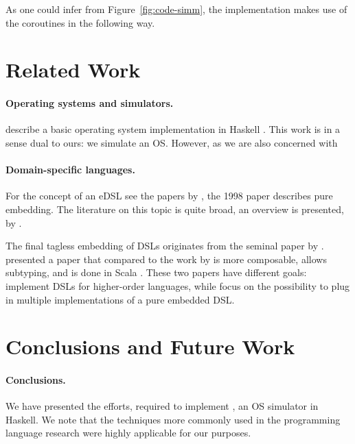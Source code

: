 As one could infer from Figure~\ref{fig:code-simm}, the implementation makes use of the coroutines in the following way. 


\section{Related Work}
\label{sec:related-work}

\paragraph{Operating systems and simulators.}

\citeauthor{house} describe a basic operating system implementation in Haskell \cite{house}.
This work is in a sense dual to ours: we simulate an OS.
However, as we are also concerned with


\paragraph{Domain-specific languages.}
For the concept of an eDSL see the papers by \citeauthor{hudak1} \cite{hudak1,hudak2}, the 1998 paper describes pure embedding.
The literature on this topic is quite broad, an overview is presented, \eg by \citeauthor{dsl-survey} \cite{dsl-survey}.

The final tagless embedding of DSLs originates from the seminal paper by \citeauthor{final_tagless_embedding} \cite{final_tagless_embedding}.
\citeauthor{Hofer:2008:PED:1449913.1449935} \cite{Hofer:2008:PED:1449913.1449935} presented a paper that compared to the work by \citeauthor{final_tagless_embedding} \cite{final_tagless_embedding} is more composable, allows subtyping, and is done in Scala \cite{odersky2008programming}.
These two papers have different goals: \citeauthor{final_tagless_embedding} implement DSLs for higher-order languages, while \citeauthor{Hofer:2008:PED:1449913.1449935} focus on the possibility to plug in multiple implementations of a pure embedded DSL.


\section{Conclusions and Future Work}
\label{sec:concl-future-work}

\paragraph{Conclusions.} 
We have presented the efforts, required to implement \soosim, an OS simulator in Haskell.
We note that the techniques more commonly used in the programming language research were highly applicable for our purposes.

